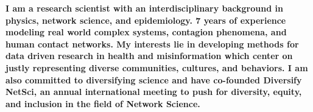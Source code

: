 \vspace{-4mm}

\begin{cvparagraph}
\textbf{%
I am a research scientist
with an interdisciplinary background in physics, network science, and epidemiology.
7 years of experience modeling real world complex systems, contagion phenomena, and human contact networks.
My interests lie in developing methods for data driven research in health and misinformation which center on justly representing diverse communities, cultures, and behaviors. I am also committed to diversifying science and have co-founded Diversify NetSci, an annual international meeting to push for diversity, equity, and inclusion in the field of Network Science. 
}
\end{cvparagraph}
\vspace{-4mm}